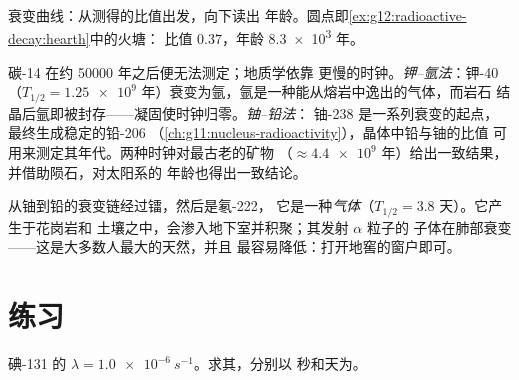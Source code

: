 \begin{omfigure}

{\small 衰变曲线：从测得的比值出发，向下读出
年龄。圆点即\cref{ex:g12:radioactive-decay:hearth}中的火塘：
比值 $0.37$，年龄 \num{8.3e3} 年。}
\end{omfigure}

\begin{example}[岩石的时钟]\label{ex:g12:radioactive-decay:rocks}
碳-14 在约 \num{50000} 年之后便无法测定；地质学依靠
更慢的时钟。\emph{钾–氩法}：钾-40（$T_{1/2} = \num{1.25e9}$
年）衰变为氩，氩是一种能从熔岩中逸出的气体，而岩石
结晶后氩即被封存——凝固使时钟归零。\emph{铀–铅法}：
铀-238 是一系列衰变的起点，最终生成稳定的铅-206
（\cref{ch:g11:nucleus-radioactivity}），晶体中铅与铀的比值
可用来测定其年代。两种时钟对最古老的矿物
（$\approx \num{4.4e9}$ 年）给出一致结果，并借助陨石，对太阳系的
年龄也得出一致结论。
\end{example}

\begin{remark}[衰变链与地窖中的气体]\label{rem:g12:radioactive-decay:radon}
从铀到铅的衰变链经过镭，然后是氡-222，
它是一种\emph{气体}（$T_{1/2} = 3.8$ 天）。它产生于花岗岩和
土壤之中，会渗入地下室并积聚；其发射 $\alpha$ 粒子的
子体在肺部衰变——这是大多数人最大的天然，并且
最容易降低：打开地窖的窗户即可。
\end{remark}

\section{练习}

\begin{exercise}[$\star$]\label{exo:g12:radioactive-decay:1}
碘-131 的 $\lambda = \qty{1.0e-6}{s^{-1}}$。求其，分别以
秒和天为。
\end{exercise}

